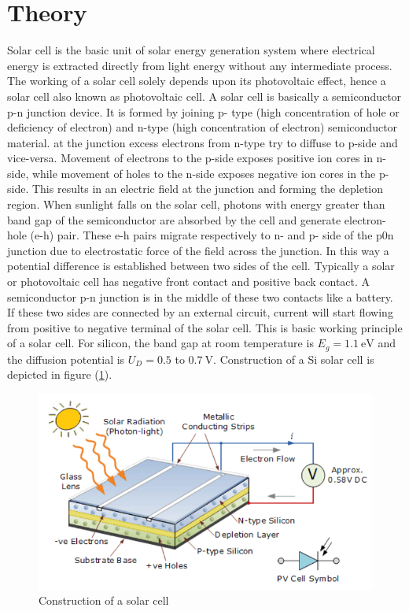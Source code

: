 \documentclass[%
 aip,
 amsmath,amssymb,
 reprint, floatfix%
]{revtex4-2}
\begin{document}
\section{Theory}
    Solar cell is the basic unit of solar energy generation system where electrical energy is
    extracted directly from light energy without any intermediate process. The working of a solar
    cell solely depends upon its photovoltaic effect, hence a solar cell also known as photovoltaic
    cell. A solar cell is basically a semiconductor p-n junction device. It is formed by joining p-
    type (high concentration of hole or deficiency of electron) and n-type (high concentration of
    electron) semiconductor material. at the junction excess electrons from n-type try to diffuse to
    p-side and vice-versa. Movement of electrons to the p-side exposes positive ion cores in n-
    side, while movement of holes to the n-side exposes negative ion cores in the p-side. This
    results in an electric field at the junction and forming the depletion region. When sunlight
    falls on the solar cell, photons with energy greater than band gap of the semiconductor are
    absorbed by the cell and generate electron-hole (e-h) pair. These e-h pairs migrate
    respectively to n- and p- side of the p0n junction due to electrostatic force of the field across
    the junction. In this way a potential difference is established between two sides of the cell.
    Typically a solar or photovoltaic cell has negative front contact and positive back contact. A
    semiconductor p-n junction is in the middle of these two contacts like a battery. If these two
    sides are connected by an external circuit, current will start flowing from positive to negative
    terminal of the solar cell. This is basic working principle of a solar cell. For silicon, the band
    gap at room temperature is $E_g = \SI{1.1}{\electronvolt}$ and the diffusion potential is $U_D = 0.5$ to $\SI{0.7}{\volt}$. Construction of a Si solar cell is depicted in figure (\ref{fig:cons}).
    \begin{figure}
        \centering
        \includegraphics[scale = 0.62]{Figures/construction.png}
        \caption{Construction of a solar cell}
        \label{fig:cons}
    \end{figure}
\end{document}
